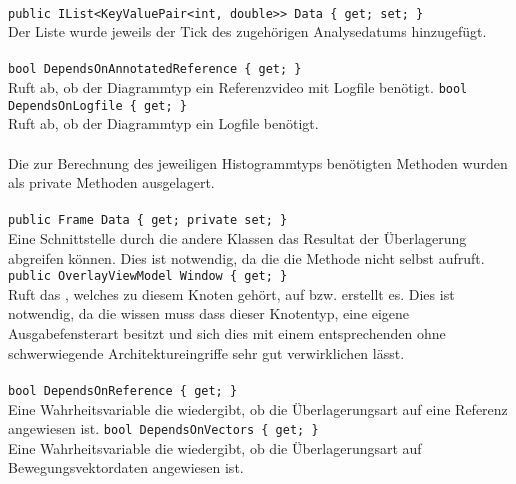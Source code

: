 \paragraph{}
\begin{itemize}
	\change \verb!public IList<KeyValuePair<int, double>> Data { get; set; }! \\
	Der Liste wurde jeweils der Tick des zugehörigen Analysedatums hinzugefügt.
\end{itemize}

\paragraph{}
\begin{itemize}
	\add \verb!bool DependsOnAnnotatedReference { get; }! \\
	Ruft ab, ob der Diagrammtyp ein Referenzvideo mit Logfile benötigt.
	\add \verb!bool DependsOnLogfile { get; }! \\
	Ruft ab, ob der Diagrammtyp ein Logfile benötigt.
\end{itemize}

\paragraph{}
Die zur Berechnung des jeweiligen Histogrammtyps benötigten Methoden wurden als private Methoden ausgelagert.

\paragraph{}
\begin{itemize}
	\add \verb!public Frame Data { get; private set; }! \\
	Eine Schnittstelle durch die andere Klassen das Resultat der Überlagerung abgreifen können. Dies ist notwendig, da die  die  Methode nicht selbst aufruft.
	\add \verb!public OverlayViewModel Window { get; }! \\
	Ruft das , welches zu diesem Knoten gehört, auf bzw. erstellt es. Dies ist notwendig, da die  wissen muss dass dieser Knotentyp, eine eigene Ausgabefensterart besitzt und sich dies mit einem entsprechenden  ohne schwerwiegende Architektureingriffe sehr gut verwirklichen lässt.
\end{itemize}

\paragraph{}
\begin{itemize}
	\add \verb!bool DependsOnReference { get; }! \\
	Eine Wahrheitsvariable die wiedergibt, ob die Überlagerungsart auf eine Referenz angewiesen ist.
	\add \verb!bool DependsOnVectors { get; }! \\
	Eine Wahrheitsvariable die wiedergibt, ob die Überlagerungsart auf Bewegungsvektordaten angewiesen ist.
\end{itemize}


